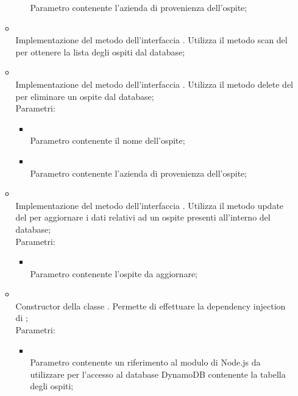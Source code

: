\begin{itemize}
\begin{itemize}
\begin{itemize}
			Parametro contenente l'azienda di provenienza dell'ospite;
		\end{itemize}
		\item[]  \\
		Implementazione del metodo dell'interfaccia . Utilizza il metodo scan del  per ottenere la lista degli ospiti dal database;\\
		\item[]  \\
		Implementazione del metodo dell'interfaccia . Utilizza il metodo delete del  per eliminare un ospite dal database;\\
		Parametri:
		\begin{itemize}
			\item {} \\
			Parametro contenente il nome dell'ospite;
			\item {} \\
			Parametro contenente l'azienda di provenienza dell'ospite;
		\end{itemize}
		\item[]  \\
		Implementazione del metodo dell'interfaccia . Utilizza il metodo update del  per aggiornare i dati relativi ad un ospite presenti all'interno del database;\\
		Parametri:
		\begin{itemize}
			\item {} \\
			Parametro contenente l'ospite da aggiornare;
		\end{itemize}
		\item[]  \\
		Constructor della classe . Permette di effettuare la dependency injection di ;\\
		Parametri:
		\begin{itemize}
			\item {} \\
			Parametro contenente un riferimento al modulo di Node.js da utilizzare per l'accesso al database DynamoDB contenente la tabella degli ospiti;
		\end{itemize}
	\end{itemize}
\end{itemize}

